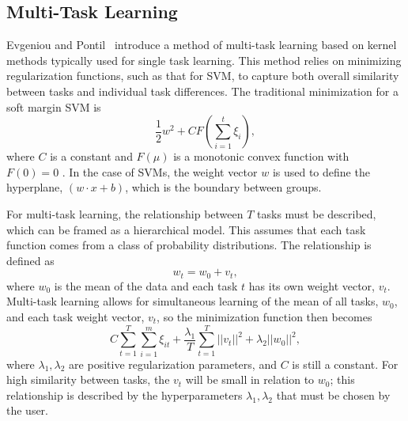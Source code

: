 \documentclass{llncs}
\begin{document}

\subsection{Multi-Task Learning}
\label{subsec:MTL}
Evgeniou and Pontil~\cite{regMTL} introduce a method of multi-task learning based on kernel methods typically used for single task learning.  This method relies on minimizing regularization functions, such as that for SVM, to capture both overall similarity between tasks and individual task differences.  The traditional minimization for a soft margin SVM is
\begin{equation}
\label{eq:svm}
\frac{1}{2}w^2 + C F\left(\sum_{i=1}^t \xi_i\right),
\end{equation}
where $C$ is a constant and $F(\mu)$ is a monotonic convex function with $F(0)=0$ \cite{svm}. In the case of SVMs, the weight vector $w$ is used to define the hyperplane, $(w \cdot x +b)$,  which is the boundary between groups.

For multi-task learning, the relationship between $T$ tasks must be described, which can be framed as a hierarchical model. This assumes that each task function comes from a class of probability distributions.  The relationship is defined as\\
\begin{equation}
\label{eq:sim}
 w_t = w_0 + v_t ,
\end{equation}
where $w_0$ is the mean of the data and each task $t$ has its own weight vector, $v_t$. Multi-task learning allows for simultaneous learning of the mean of all tasks, $w_0$, and each task weight vector, $v_t$, so the minimization function then becomes\\
\begin{equation}
\label{eq:mtlsvm}
 C \sum_{t=1}^T \sum_{i=1}^m \xi_{it} + \frac{\lambda_1}{T} \sum_{t=1}^T ||v_t||^2 + \lambda_2||w_0||^2 ,
\end{equation}
where $\lambda_1, \lambda_2$ are positive regularization parameters, and $C$ is still a constant. For high similarity between tasks, the $v_t$ will be small in relation to $w_0$; this relationship is described by the hyperparameters $\lambda_1, \lambda_2$ that must be chosen by the user.
\end{document}
